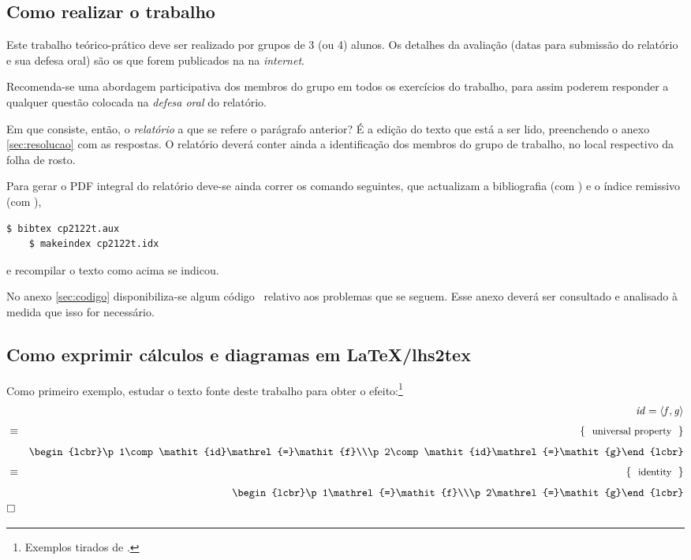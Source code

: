 \documentclass[a4paper]{article}
\newcommand{\Varid}[1]{\mathit{#1}}
\begin{document}
\subsection{Como realizar o trabalho}
Este trabalho teórico-prático deve ser realizado por grupos de 3 (ou 4) alunos.
Os detalhes da avaliação (datas para submissão do relatório e sua defesa
oral) são os que forem publicados na  na \emph{internet}.

Recomenda-se uma abordagem participativa dos membros do grupo em todos os
exercícios do trabalho, para assim poderem responder a qualquer questão colocada
na \emph{defesa oral} do relatório.

Em que consiste, então, o \emph{relatório} a que se refere o parágrafo anterior?
É a edição do texto que está a ser lido, preenchendo o anexo \ref{sec:resolucao}
com as respostas. O relatório deverá conter ainda a identificação dos membros
do grupo de trabalho, no local respectivo da folha de rosto.

Para gerar o PDF integral do relatório deve-se ainda correr os comando seguintes,
que actualizam a bibliografia (com \Bibtex) e o índice remissivo (com \Makeindex),
\begin{Verbatim}[fontsize=\small]
    $ bibtex cp2122t.aux
    $ makeindex cp2122t.idx
\end{Verbatim}
e recompilar o texto como acima se indicou.

No anexo \ref{sec:codigo} disponibiliza-se algum código \Haskell\ relativo
aos problemas que se seguem. Esse anexo deverá ser consultado e analisado
à medida que isso for necessário.

\subsection{Como exprimir cálculos e diagramas em LaTeX/lhs2tex}
Como primeiro exemplo, estudar o texto fonte deste trabalho para obter o
efeito:\footnote{Exemplos tirados de \cite{Ol18}.}
\begin{eqnarray*}
\start
     \ensuremath{\Varid{id}\mathrel{=}\conj{\Varid{f}}{\Varid{g}}}
%
\just\equiv{ universal property }
%
        \ensuremath{\begin{lcbr}\p1\comp \Varid{id}\mathrel{=}\Varid{f}\\\p2\comp \Varid{id}\mathrel{=}\Varid{g}\end{lcbr}}
%
\just\equiv{ identity }
%
        \ensuremath{\begin{lcbr}\p1\mathrel{=}\Varid{f}\\\p2\mathrel{=}\Varid{g}\end{lcbr}}
\qed
\end{eqnarray*}
\end{document}
